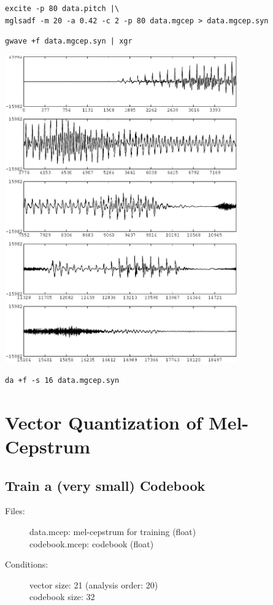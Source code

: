 \documentclass[a4paper,10pt]{article}
\begin{document}
\begin{verbatim}
excite -p 80 data.pitch |\
mglsadf -m 20 -a 0.42 -c 2 -p 80 data.mgcep > data.mgcep.syn
\end{verbatim}

\begin{verbatim}
gwave +f data.mgcep.syn | xgr
\end{verbatim}

\includegraphics[width=10cm]{eps/data.mgcep.syn.gwave.eps}

\begin{verbatim}
da +f -s 16 data.mgcep.syn
\end{verbatim}

\section{Vector Quantization of Mel-Cepstrum}

\subsection{Train a (very small) Codebook}
\begin{description}
\item[Files:]
   data.mcep: mel-cepstrum for training (float) \\
   codebook.mcep: codebook (float)
\item[Conditions:]
   vector size: 21 (analysis order: 20)\\
   codebook size: 32
\end{description}
\end{document}
